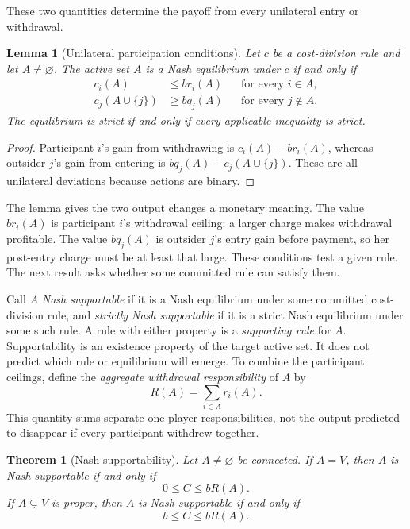 \documentclass[preprint,12pt,authoryear]{elsarticle}
\newtheorem{theorem}{Theorem}
\newtheorem{lemma}{Lemma}
\begin{document}
These two quantities determine the payoff from every unilateral entry or
withdrawal.

\begin{lemma}[Unilateral participation conditions]
\label{lem:participation-conditions}
Let \(c\) be a cost-division rule and let \(A\ne\varnothing\). The active set
\(A\) is a Nash equilibrium under \(c\) if and only if
\begin{align}
 c_i(A)&\leq br_i(A)
 &&\text{for every }i\in A, \label{eq:withdrawal-ceilings}\\
 c_j(A\cup\{j\})&\geq bq_j(A)
 &&\text{for every }j\notin A. \label{eq:entry-charges}
\end{align}
The equilibrium is strict if and only if every applicable inequality is
strict.
\end{lemma}

\begin{proof}
Participant \(i\)'s gain from withdrawing is \(c_i(A)-br_i(A)\), whereas
outsider \(j\)'s gain from entering is
\(bq_j(A)-c_j(A\cup\{j\})\). These are all unilateral deviations because
actions are binary.
\end{proof}

The lemma gives the two output changes a monetary meaning. The value
\(br_i(A)\) is participant \(i\)'s withdrawal ceiling: a larger charge makes
withdrawal profitable. The value \(bq_j(A)\) is outsider \(j\)'s entry gain
before payment, so her post-entry charge must be at least that large. These
conditions test a given rule. The next result asks whether some committed rule
can satisfy them.

Call \(A\) \emph{Nash supportable} if it is a Nash equilibrium under some
committed cost-division rule, and \emph{strictly Nash supportable} if it is a
strict Nash equilibrium under some such rule. A rule with either property is a
\emph{supporting rule} for \(A\). Supportability is an existence property
of the target active set. It does not predict  which rule or equilibrium will
emerge. To combine the participant ceilings, define the \emph{aggregate
withdrawal responsibility} of \(A\) by
\[
 R(A)=\sum_{i\in A}r_i(A).
\]
This quantity sums separate one-player responsibilities, not the output
predicted to disappear if every participant withdrew together.

\begin{theorem}[Nash supportability]
\label{thm:payment-characterization}
Let \(A\ne\varnothing\) be connected. If \(A=V\), then \(A\) is Nash
supportable if and only if
\[
 0\leq C\leq bR(A).
\]
If \(A\subsetneq V\) is proper, then \(A\) is Nash supportable if and only if
\[
 b\leq C\leq bR(A).
\]
\end{theorem}
\end{document}
